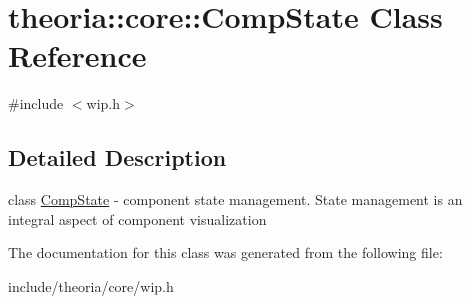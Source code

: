 \hypertarget{classtheoria_1_1core_1_1CompState}{}\section{theoria\+:\+:core\+:\+:Comp\+State Class Reference}
\label{classtheoria_1_1core_1_1CompState}


{\ttfamily \#include $<$wip.\+h$>$}



\subsection{Detailed Description}
class \hyperlink{classtheoria_1_1core_1_1CompState}{Comp\+State} -\/ component state management. State management is an integral aspect of component visualization 

The documentation for this class was generated from the following file\+:\begin{DoxyCompactItemize}
\item 
include/theoria/core/wip.\+h\end{DoxyCompactItemize}
